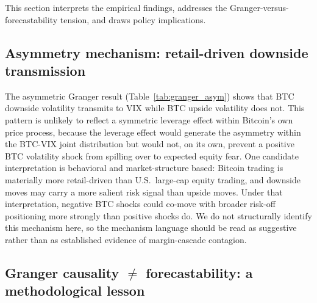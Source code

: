 \documentclass[11pt,a4paper]{article}
\begin{document}
This section interprets the empirical findings, addresses the Granger-versus-forecastability tension, and draws policy implications.

\subsection{Asymmetry mechanism: retail-driven downside transmission}
\label{subsec:d_asym}

The asymmetric Granger result (Table~\ref{tab:granger_asym}) shows that BTC downside volatility transmits to VIX while BTC upside volatility does not. This pattern is unlikely to reflect a symmetric leverage effect within Bitcoin's own price process, because the leverage effect would generate the asymmetry within the BTC-VIX joint distribution but would not, on its own, prevent a positive BTC volatility shock from spilling over to expected equity fear. One candidate interpretation is behavioral and market-structure based: Bitcoin trading is materially more retail-driven than U.S.\ large-cap equity trading, and downside moves may carry a more salient risk signal than upside moves. Under that interpretation, negative BTC shocks could co-move with broader risk-off positioning more strongly than positive shocks do. We do not structurally identify this mechanism here, so the mechanism language should be read as suggestive rather than as established evidence of margin-cascade contagion.

\subsection{Granger causality $\ne$ forecastability: a methodological lesson}
\label{subsec:d_gc_vs_fc}
\end{document}
